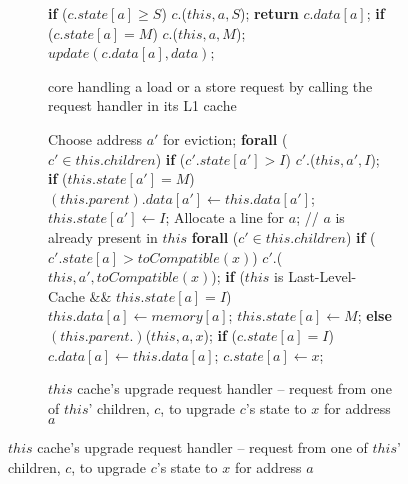 \begin{figure}
\small

\begin{subfigure}{\linewidth}
\begin{boxedminipage}{\linewidth}
\begin{algorithmic}
    \State \textbf{if} ($c.state[a] \ge S$)
    \State \;\;\;\; \call{} $c.$\uReq($this, a, S$);
    \State \textbf{return} $c.data[a]$;
    \State \textbf{if} ($c.state[a] = M$)
    \State \;\;\;\; \call{} $c.$\uReq($this, a, M$);
    \State $update(c.data[a], data)$;
  \EndIf
\EndProc
\end{algorithmic}
\end{boxedminipage}
\caption{core handling a load or a store request by calling the request
handler in its L1 cache}
\label{coreHandle}
\end{subfigure}

\begin{subfigure}{\linewidth}
\begin{boxedminipage}{\linewidth}
\begin{algorithmic}
        \State Choose address $a'$ for eviction;
        \State \textbf{forall} ($c' \in this.children$)
        \State \;\;\;\; \textbf{if} ($c'.state[a'] > I$)
        \State \;\;\;\;\;\;\;\; \call{} $c'.$\dReq($this, a', I$);
          \State \textbf{if} ($this.state[a'] = M$)
          \State \;\;\;\; $(this.parent).data[a'] \gets this.data[a']$;
          \State $this.state[a'] \gets I$;
        \EndIf
      \EndIf
      \State Allocate a line for $a$;
    \EndIf
    \State // $a$ is already present in $this$
    \State \textbf{forall} ($c' \in this.children$)
    \State \;\;\;\; \textbf{if} ($c'.state[a] > toCompatible(x)$)
    \State \;\;\;\;\;\;\;\; \call{} $c'.$\dReq($this, a', toCompatible(x)$);
    \State \textbf{if} ($this$ is Last-Level-Cache \&\& $this.state[a] = I$) \bopen
    \State \;\;\;\; $this.data[a] \gets memory[a]$;
    \State \;\;\;\; $this.state[a] \gets M$;
    \State \bclose \;\textbf{else}
    \State \;\;\;\; \call{} $(this.parent.)$\uReq{}($this, a, x$);
  \State \textbf{if} ($c.state[a] = I$)
  \State \;\;\;\; $c.data[a] \gets this.data[a]$;
  \State $c.state[a] \gets x$;
  \EndIf
\EndProc
\end{algorithmic}
\end{boxedminipage}
\caption{$this$ cache's upgrade request handler -- request from one of $this$' children, $c$, to upgrade $c$'s state to $x$ for address $a$ }
\label{atomicUReq1}
\end{subfigure}


\end{figure}
